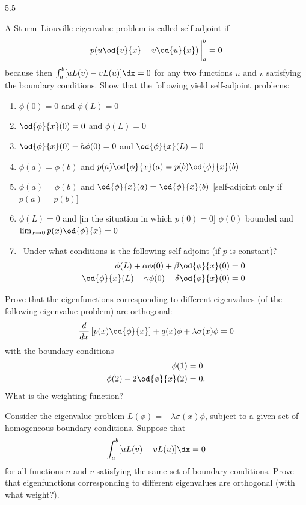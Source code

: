 \begin{exercises}{5.5}

\item A Sturm--Liouville eigenvalue problem is called self-adjoint if
\[
p\!\left(u\od{v}{x} - v\od{u}{x}\right)\bigg|_a^b = 0
\]
because then $\int_a^b [uL(v) - vL(u)]\dx = 0$ for any two functions $u$ and $v$ satisfying the boundary conditions.  Show that the following yield self-adjoint problems:
\begin{enumerate}
\item $\phi(0) = 0$ and $\phi(L) = 0$
\item $\displaystyle\od{\phi}{x}(0) = 0$ and $\phi(L) = 0$
\item $\displaystyle\od{\phi}{x}(0) - h\phi(0) = 0$ and $\displaystyle\od{\phi}{x}(L) = 0$
\item $\phi(a) = \phi(b)$ and $p(a)\displaystyle\od{\phi}{x}(a) = p(b)\od{\phi}{x}(b)$
\item $\phi(a) = \phi(b)$ and $\displaystyle\od{\phi}{x}(a) = \od{\phi}{x}(b)$ [self-adjoint only if $p(a) = p(b)$]
\item $\phi(L) = 0$ and [in the situation in which $p(0) = 0$] $\phi(0)$ bounded and $\lim_{x\to 0} p(x)\displaystyle\od{\phi}{x} = 0$
\item\starred\ Under what conditions is the following self-adjoint (if $p$ is constant)?
\begin{align*}
\phi(L) + \alpha\phi(0) + \beta\od{\phi}{x}(0) &= 0 \\
\od{\phi}{x}(L) + \gamma\phi(0) + \delta\od{\phi}{x}(0) &= 0
\end{align*}
\end{enumerate}

\item Prove that the eigenfunctions corresponding to different eigenvalues (of the following eigenvalue problem) are orthogonal:
\[
\frac{d}{d x}\left[p(x)\od{\phi}{x}\right] + q(x)\phi + \lambda\sigma(x)\phi = 0
\]
with the boundary conditions
\begin{align*}
\phi(1) &= 0 \\
\phi(2) - 2\od{\phi}{x}(2) &= 0.
\end{align*}
What is the weighting function?

\item Consider the eigenvalue problem $L(\phi) = -\lambda\sigma(x)\phi$, subject to a given set of homogeneous boundary conditions.  Suppose that
\[
\int_a^b [uL(v) - vL(u)]\dx = 0
\]
for all functions $u$ and $v$ satisfying the same set of boundary conditions.  Prove that eigenfunctions corresponding to different eigenvalues are orthogonal (with what weight?).


\end{exercises}
